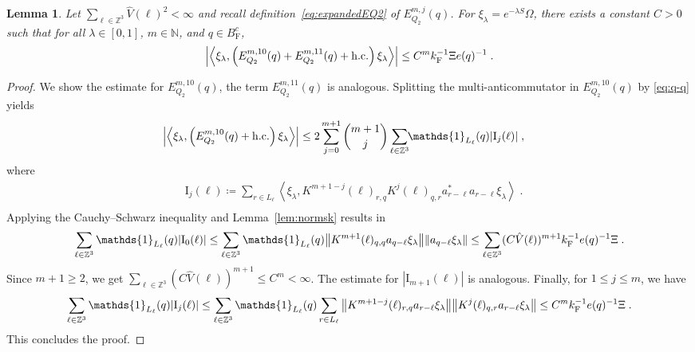 \documentclass[12pt,a4paper]{article}
\numberwithin{equation}{section}
\newcommand{\NNN}{\mathbb{N}}
\newcommand{\1}{\mathbb{I}}
\newcommand{\F}{\mathrm{F}}
\newcommand{\I}{\mathrm{I}}
\newcommand{\Zstar}{\mathbb{Z}^3} %
\newcommand{\Z}{\mathbb{Z}}
\newcommand{\eva}[1]{\left\langle #1 \right\rangle}
\theoremstyle{plain}
\newtheorem{lemma}[theorem]{Lemma}
\theoremstyle{definition}
\theoremstyle{remark}
\theoremstyle{plain}
\theoremstyle{definition}
\theoremstyle{remark}
\begin{document}
\begin{lemma} \label{lem:EQ212}
Let $ \sum_{\ell \in \Zstar} \hat{V}(\ell)^2 < \infty $ and recall definition~\eqref{eq:expandedEQ2} of $ E_{Q_2}^{m,j}(q) $. For $\xi_\lambda = e^{-\lambda S} \Omega$, there exists a constant $ C > 0 $ such that for all $ \lambda \in [0,1] $, $ m \in \NNN $, and $ q \in B_{\F}^c $,
\begin{equation}
	\abs{\eva{\xi_\lambda,\left(E^{m,10}_{Q_2}(q) + E^{m,11}_{Q_2}(q) + \mathrm{h.c.}\right) \xi_\lambda }}
	\leq C^m k_{\F}^{-1} \Xi e(q)^{-1} \;. \label{eq:estEQ212}
\end{equation}
\end{lemma}

\begin{proof}
We show the estimate for $ E^{m,10}_{Q_2}(q) $, the term $ E^{m,11}_{Q_2}(q) $ is analogous.
Splitting the multi-anticommutator in $ E^{m,10}_{Q_2}(q) $ by \eqref{eq:q-q} yields
\begin{equation} \label{eq:EQ2121}
\begin{aligned}
	& \abs{\eva{\xi_\lambda,\left(E^{m,10}_{Q_2}(q) + \mathrm{h.c.}\right) \xi_\lambda }}
	\le 2 \sum_{j=0}^{m+1} {{m+1}\choose j} \sum_{\ell \in \Zstar}\!\! \mathds{1}_{L_\ell}(q) |\I_j(\ell)| \;,
\end{aligned}
\end{equation}
where
\begin{equation}
\begin{aligned}
	& \I_j(\ell)
	\coloneq \sum_{r\in L_{\ell}}
		\eva{\xi_\lambda, K^{m+1-j}(\ell)_{r,q} K^{j}(\ell)_{q,r} a^*_{r-\ell} a_{r-\ell} \xi_\lambda} \;. \\
\end{aligned}
\end{equation}
Applying the Cauchy--Schwarz inequality and Lemma~\ref{lem:normsk} results in
\begin{equation}
	\sum_{\ell \in \Zstar} \mathds{1}_{L_\ell}(q) |\I_0(\ell)|
	\leq \sum_{\ell \in \Zstar} \mathds{1}_{L_\ell}(q) \norm{ K^{m+1}(\ell)_{q,q} a_{q-\ell} \xi_\lambda}\norm{ a_{q-\ell} \xi_\lambda }
	\leq \sum_{\ell \in \Zstar} (C \hat{V}(\ell))^{m+1}
		k_{\F}^{-1} e(q)^{-1} \Xi \;.\label{eq:estEQ2121}
\end{equation}
Since $ m+1 \ge 2 $, we get $ \sum_{\ell \in \Zstar} (C \hat{V}(\ell))^{m+1} \le C^m < \infty $. The estimate for $ |\I_{m+1}(\ell)| $ is analogous. Finally, for $ 1 \le j \le m $, we have
\begin{equation}
	\sum_{\ell \in \Zstar} \mathds{1}_{L_\ell}(q) |\I_j(\ell)|
	\leq \sum_{\ell \in \Zstar} \mathds{1}_{L_\ell}(q)
		\sum\limits_{r \in L_{\ell}}
		\norm{ K^{m+1-j}(\ell)_{r,q} a_{r-\ell}\xi_\lambda}
		\norm{ K^j(\ell)_{q,r} a_{r-\ell} \xi_\lambda }
	\leq C^m k_{\F}^{-1} e(q)^{-1} \Xi \;. \label{eq:estEQ2122}
\end{equation}
This concludes the proof.
\end{proof}
\end{document}
